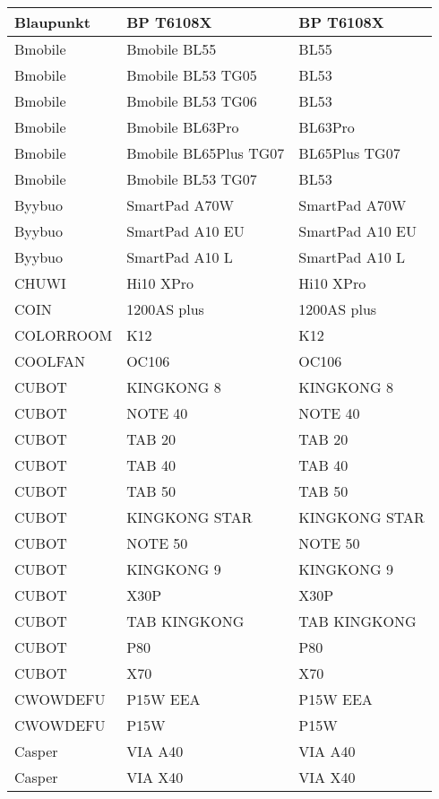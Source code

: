 \begin{tabularx}{\linewidth}{|l|X|X|}
        Blaupunkt & BP T6108X & BP T6108X \\ \hline
        Bmobile & Bmobile BL55 & BL55 \\ \hline
        Bmobile & Bmobile BL53 TG05 & BL53 \\ \hline
        Bmobile & Bmobile BL53 TG06 & BL53 \\ \hline
        Bmobile & Bmobile BL63Pro & BL63Pro \\ \hline
        Bmobile & Bmobile BL65Plus TG07 & BL65Plus TG07 \\ \hline
        Bmobile & Bmobile BL53 TG07 & BL53 \\ \hline
        Byybuo & SmartPad A70W & SmartPad A70W \\ \hline
        Byybuo & SmartPad A10 EU & SmartPad A10 EU \\ \hline
        Byybuo & SmartPad A10 L & SmartPad A10 L \\ \hline
        CHUWI & Hi10 XPro & Hi10 XPro \\ \hline
        COIN & 1200AS plus & 1200AS plus \\ \hline
        COLORROOM & K12 & K12 \\ \hline
        COOLFAN & OC106 & OC106 \\ \hline
        CUBOT & KINGKONG 8 & KINGKONG 8 \\ \hline
        CUBOT & NOTE 40 & NOTE 40 \\ \hline
        CUBOT & TAB 20 & TAB 20 \\ \hline
        CUBOT & TAB 40 & TAB 40 \\ \hline
        CUBOT & TAB 50 & TAB 50 \\ \hline
        CUBOT & KINGKONG STAR & KINGKONG STAR \\ \hline
        CUBOT & NOTE 50 & NOTE 50 \\ \hline
        CUBOT & KINGKONG 9 & KINGKONG 9 \\ \hline
        CUBOT & X30P & X30P \\ \hline
        CUBOT & TAB KINGKONG & TAB KINGKONG \\ \hline
        CUBOT & P80 & P80 \\ \hline
        CUBOT & X70 & X70 \\ \hline
        CWOWDEFU & P15W EEA & P15W EEA \\ \hline
        CWOWDEFU & P15W & P15W \\ \hline
        Casper & VIA A40 & VIA A40 \\ \hline
        Casper & VIA X40 & VIA X40 \\ \hline

\end{tabularx}
